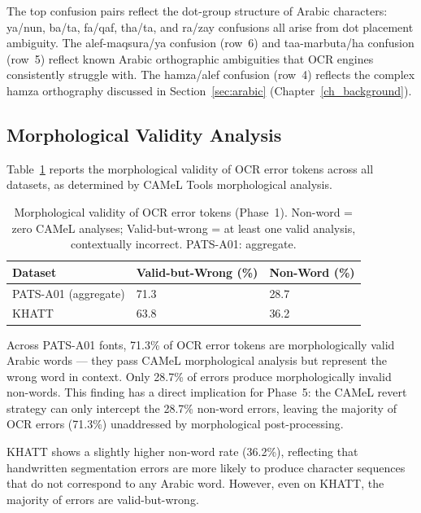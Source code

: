 The top confusion pairs reflect the dot-group structure of Arabic characters:
ya/nun, ba/ta, fa/qaf, tha/ta, and ra/zay confusions all arise from dot
placement ambiguity. The alef-maqsura/ya confusion (row~6) and taa-marbuta/ha
confusion (row~5) reflect known Arabic orthographic ambiguities that OCR
engines consistently struggle with. The hamza/alef confusion (row~4) reflects
the complex hamza orthography discussed in Section~\ref{sec:arabic}
(Chapter~\ref{ch_background}).

\subsection{Morphological Validity Analysis}
\label{subsec:res_p1_morph}

Table~\ref{tab:p1_morph} reports the morphological validity of OCR error
tokens across all datasets, as determined by CAMeL Tools morphological
analysis.

\begin{table}[htbp]
  \centering
  \caption{Morphological validity of OCR error tokens (Phase~1).
           Non-word = zero CAMeL analyses; Valid-but-wrong = at least one
           valid analysis, contextually incorrect. PATS-A01: aggregate.}
  \label{tab:p1_morph}
  \begin{tabularx}{\textwidth}{lXX}
    \toprule
    \textbf{Dataset} & \textbf{Valid-but-Wrong (\%)} & \textbf{Non-Word (\%)} \\
    \midrule
    PATS-A01 (aggregate) & 71.3 & 28.7 \\
    KHATT                & 63.8 & 36.2 \\
    \bottomrule
  \end{tabularx}
\end{table}

Across PATS-A01 fonts, 71.3\% of OCR error tokens are morphologically valid
Arabic words --- they pass CAMeL morphological analysis but represent the
wrong word in context. Only 28.7\% of errors produce morphologically invalid
non-words. This finding has a direct implication for Phase~5: the CAMeL
revert strategy can only intercept the 28.7\% non-word errors, leaving the
majority of OCR errors (71.3\%) unaddressed by morphological post-processing.

KHATT shows a slightly higher non-word rate (36.2\%), reflecting that
handwritten segmentation errors are more likely to produce character sequences
that do not correspond to any Arabic word. However, even on KHATT, the
majority of errors are valid-but-wrong.


